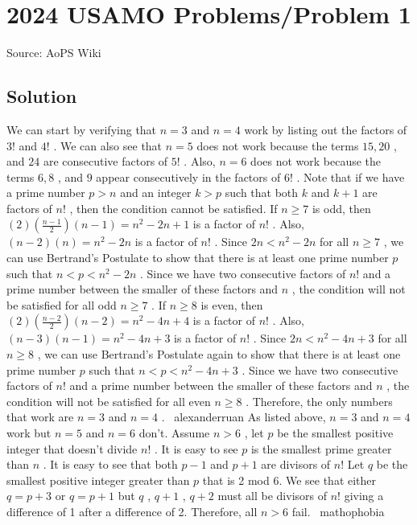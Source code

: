 \documentclass[12pt]{article}
\begin{document}
\section*{{2024 USAMO Problems/Problem 1}}
Source: AoPS Wiki

\subsection*{Solution}
We can start by verifying that $n=3$ and $n=4$ work by listing out the factors of $3!$ and $4!$ . We can also see that $n=5$ does not work because the terms $15, 20$ , and $24$ are consecutive factors of $5!$ . Also, $n=6$ does not work because the terms $6, 8$ , and $9$ appear consecutively in the factors of $6!$ . Note that if we have a prime number $p>n$ and an integer $k>p$ such that both $k$ and $k+1$ are factors of $n!$ , then the condition cannot be satisfied. If $n\geq7$ is odd, then $(2)(\frac{n-1}{2})(n-1)=n^2-2n+1$ is a factor of $n!$ . Also, $(n-2)(n)=n^2-2n$ is a factor of $n!$ . Since $2n<n^2-2n$ for all $n\geq7$ , we can use Bertrand's Postulate to show that there is at least one prime number $p$ such that $n<p<n^2-2n$ . Since we have two consecutive factors of $n!$ and a prime number between the smaller of these factors and $n$ , the condition will not be satisfied for all odd $n\geq7$ . If $n\geq8$ is even, then $(2)(\frac{n-2}{2})(n-2)=n^2-4n+4$ is a factor of $n!$ . Also, $(n-3)(n-1)=n^2-4n+3$ is a factor of $n!$ . Since $2n<n^2-4n+3$ for all $n\geq8$ , we can use Bertrand's Postulate again to show that there is at least one prime number $p$ such that $n<p<n^2-4n+3$ . Since we have two consecutive factors of $n!$ and a prime number between the smaller of these factors and $n$ , the condition will not be satisfied for all even $n\geq8$ . Therefore, the only numbers that work are $n=3$ and $n=4$ . ~alexanderruan As listed above, $n=3$ and $n=4$ work but $n=5$ and $n=6$ don't. Assume $n>6$ , let $p$ be the smallest positive integer that doesn't divide $n!$ . It is easy to see $p$ is the smallest prime greater than $n$ . It is easy to see that both $p-1$ and $p+1$ are divisors of $n!$ Let $q$ be the smallest positive integer greater than $p$ that is 2 mod 6. We see that either $q=p+3$ or $q=p+1$ but $q$ , $q+1$ , $q+2$ must all be divisors of $n!$ giving a difference of 1 after a difference of 2. Therefore, all $n>6$ fail.
~mathophobia
\end{document}
